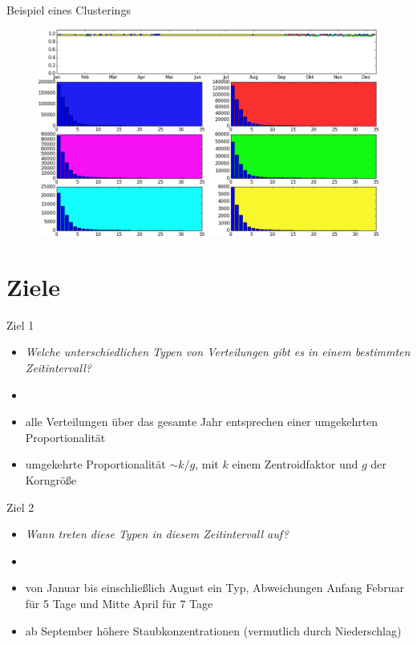 \documentclass{beamer}
\begin{document}
    \begin{frame}{Beispiel eines Clusterings}
    	\begin{figure}
    		\centering\includegraphics[width=\textwidth]{histogramm.png}
    	\end{figure}
    \end{frame}


    \section{Ziele}
    \begin{frame}{Ziel 1}
    	\begin{itemize}
    		\setlength\itemsep{1em}
    		\item[] \textit{Welche unterschiedlichen Typen von Verteilungen gibt es in einem bestimmten Zeitintervall?}
    		\item[]
    		\item alle Verteilungen über das gesamte Jahr entsprechen einer umgekehrten Proportionalität
    		\item umgekehrte Proportionalität $\sim k/g$, mit $k$ einem Zentroidfaktor und $g$ der Korngröße
    	\end{itemize}
    \end{frame}

    \begin{frame}{Ziel 2}
    	\begin{itemize}
    		\setlength\itemsep{1em}
    		\item[] \textit{Wann treten diese Typen in diesem Zeitintervall auf?}
    		\item[]
    		\item von Januar bis einschließlich August ein Typ, Abweichungen Anfang Februar für 5 Tage und Mitte April für 7 Tage
    		\item ab September höhere Staubkonzentrationen (vermutlich durch Niederschlag)
    	\end{itemize}
    \end{frame}
\end{document}
